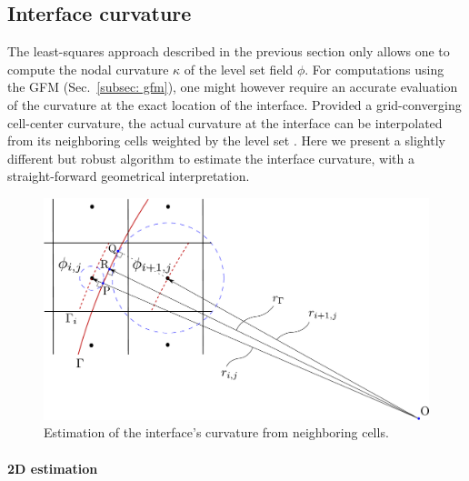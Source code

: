 \subsection{Interface curvature}

The least-squares approach described in the previous section only allows one to compute the nodal curvature $\kappa$ of the level set field $\phi$. For computations using the GFM (Sec.\ \ref{subsec: gfm}), one might however require an accurate evaluation of the curvature at the exact location of the interface. Provided a grid-converging cell-center curvature, the actual curvature at the interface can be interpolated from its neighboring cells weighted by the level set \cite{Francois_JCP_2006, Luo&Hu_JCP_2015}. Here we present a slightly different but robust algorithm to estimate the interface curvature, with a straight-forward geometrical interpretation. 

\begin{figure}[t!]
 \begin{center}
 \includegraphics[width=.75\columnwidth]{Figures/icurv_new.pdf}
 \end{center}
 \caption{Estimation of the interface's curvature from neighboring cells.}
 \label{fig: icurv}
\end{figure}


\paragraph{2D estimation}

